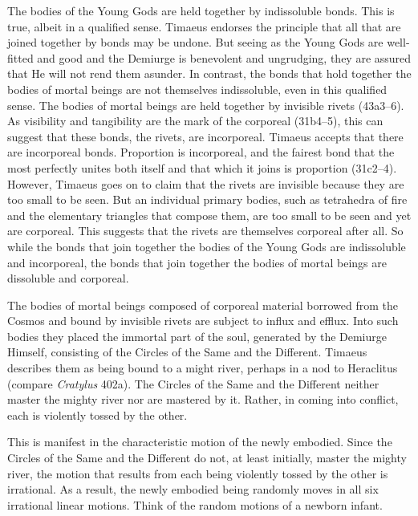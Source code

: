 The bodies of the Young Gods are held together by indissoluble bonds. This is true, albeit in a qualified sense. Timaeus endorses the principle that all that are joined together by bonds may be undone. But seeing as the Young Gods are well-fitted and good and the Demiurge is benevolent and ungrudging, they are assured that He will not rend them asunder. In contrast, the bonds that hold together the bodies of mortal beings are not themselves indissoluble, even in this qualified sense. The bodies of mortal beings are held together by invisible rivets (43a3--6). As visibility and tangibility are the mark of the corporeal (31b4–5), this can suggest that these bonds, the rivets, are incorporeal. Timaeus accepts that there are incorporeal bonds. Proportion is incorporeal, and the fairest bond that the most perfectly unites both itself and that which it joins is proportion (31c2–4). However, Timaeus goes on to claim that the rivets are invisible because they are too small to be seen. But an individual primary bodies, such as tetrahedra of fire and the elementary triangles that compose them, are too small to be seen and yet are corporeal. This suggests that the rivets are themselves corporeal after all. So while the bonds that join together the bodies of the Young Gods are indissoluble and incorporeal, the bonds that join together the bodies of mortal beings are dissoluble and corporeal.

The bodies of mortal beings composed of corporeal material borrowed from the Cosmos and bound by invisible rivets are subject to influx and efflux. Into such bodies they placed the immortal part of the soul, generated by the Demiurge Himself, consisting of the Circles of the Same and the Different. Timaeus describes them as being bound to a might river, perhaps in a nod to Heraclitus (compare \emph{Cratylus} 402a). The Circles of the Same and the Different neither master the mighty river nor are mastered by it. Rather, in coming into conflict, each is violently tossed by the other.

This is manifest in the characteristic motion of the newly embodied. Since the Circles of the Same and the Different do not, at least initially, master the mighty river, the motion that results from each being violently tossed by the other is irrational. As a result, the newly embodied being randomly moves in all six irrational linear motions. Think of the random motions of a newborn infant.


